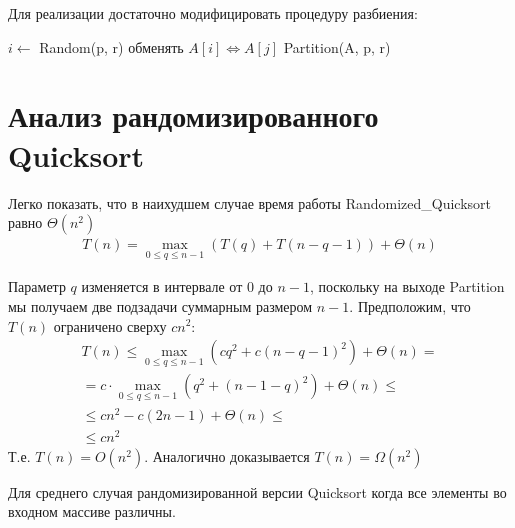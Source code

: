 \documentclass[11pt]{article}
\begin{document}
Для реализации достаточно модифицировать процедуру разбиения:
\begin{codebox}
\li	$i \gets $ Random(p, r)
\li	обменять $A[i] \iff A[j]$
\li	\Return Partition(A, p, r)
\End
\end{codebox}

\section{Анализ рандомизированного Quicksort}

Легко показать, что в наихудшем случае время работы Randomized\_Quicksort равно $\Theta(n^2)$
\begin{align*}
T(n) = \max_{0 \leqslant q \leqslant n-1} (T(q) + T(n-q-1)) + \Theta(n)
\end{align*}

Параметр $q$ изменяется в интервале от 0 до $n-1$, поскольку на выходе Partition мы получаем
две подзадачи суммарным размером $n-1$. Предположим, что $T(n)$ ограничено сверху $cn^2$:
\begin{align*}
T(n) \leqslant \max_{0 \leqslant q \leqslant n-1} (cq^2 + c(n - q -1)^2) + \Theta(n) = \\
= c \cdot \max_{0 \leqslant q \leqslant n-1} (q^2 + (n-1-q)^2) +\Theta(n) \leqslant \\
\leqslant cn^2 - c(2n -1) + \Theta(n) \leqslant \\
\leqslant cn^2
\end{align*}
Т.е. $T(n) = O(n^2)$. Аналогично доказывается $T(n) = \Omega(n^2)$

Для среднего случая рандомизированной версии Quicksort когда все элементы во входном
массиве различны.
\end{document}

